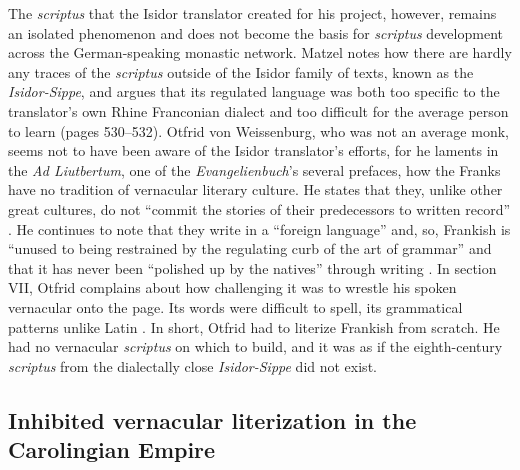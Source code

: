The \textit{scriptus} that the Isidor translator created for his project, however, remains an isolated phenomenon and does not become the basis for \textit{scriptus} development across the German-speaking monastic network. Matzel notes how there are hardly any traces of the \textit{scriptus} outside of the Isidor family of texts, known as the \textit{Isidor-Sippe}, and argues that its regulated language was both too specific to the translator’s own Rhine Franconian dialect and too difficult for the average person to learn (pages 530--532). Otfrid von Weissenburg, who was not an average monk, seems not to have been aware of the Isidor translator’s efforts, for he laments in the \textit{Ad Liutbertum}, one of the \textit{Evangelienbuch}’s several prefaces, how the Franks have no tradition of vernacular literary culture. He states that they, unlike other great cultures, do not “commit the stories of their predecessors to written record” \citep[886]{Magoun1943}. He continues to note that they write in a “foreign language” and, so, Frankish is “unused to being restrained by the regulating curb of the art of grammar” and that it has never been “polished up by the natives” through writing \citep[880, 886]{Magoun1943}. In section VII, Otfrid complains about how challenging it was to wrestle his spoken vernacular onto the page. Its words were difficult to spell, its grammatical patterns unlike Latin \citep[880]{Magoun1943}. In short, Otfrid had to literize Frankish from scratch. He had no vernacular \textit{scriptus} on which to build, and it was as if the eighth-century \textit{scriptus} from the dialectally close \textit{Isidor-Sippe} did not exist.

\subsection{Inhibited vernacular literization in the Carolingian Empire}\label{sec:3:3.1.2}


